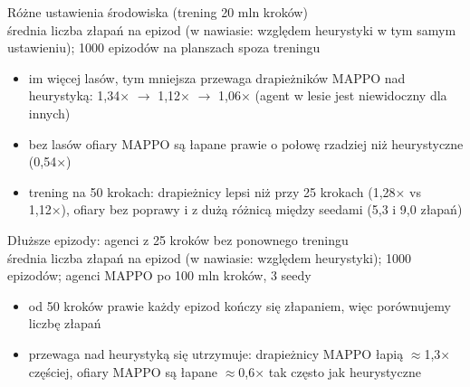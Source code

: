 \documentclass[aspectratio=169,10pt]{beamer}
\begin{document}
\begin{frame}{Różne ustawienia środowiska (trening 20 mln kroków)}
  \centering
  \scriptsize
  \\[2pt]
  {\tiny średnia liczba złapań na epizod (w nawiasie: względem heurystyki w tym samym ustawieniu); 1000 epizodów na planszach spoza treningu}\\[8pt]
  \raggedright
  \small
  \begin{itemize}
    \item im więcej lasów, tym mniejsza przewaga drapieżników MAPPO nad heurystyką: 1,34× $\to$ 1,12× $\to$ 1,06×
      (agent w lesie jest niewidoczny dla innych)
    \item bez lasów ofiary MAPPO są łapane prawie o połowę rzadziej niż heurystyczne (0,54×)
    \item trening na 50 krokach: drapieżnicy lepsi niż przy 25 krokach (1,28× vs 1,12×),
      ofiary bez poprawy i z dużą różnicą między seedami (5,3 i 9,0 złapań)
  \end{itemize}
\end{frame}

\begin{frame}{Dłuższe epizody: agenci z 25 kroków bez ponownego treningu}
  \centering
  \scriptsize
  \\[2pt]
  {\tiny średnia liczba złapań na epizod (w nawiasie: względem heurystyki); 1000 epizodów; agenci MAPPO po 100 mln kroków, 3 seedy}\\[8pt]
  \raggedright
  \small
  \begin{itemize}
    \item od 50 kroków prawie każdy epizod kończy się złapaniem, więc porównujemy liczbę złapań
    \item przewaga nad heurystyką się utrzymuje: drapieżnicy MAPPO łapią $\approx$1,3× częściej,
      ofiary MAPPO są łapane $\approx$0,6× tak często jak heurystyczne
  \end{itemize}
\end{frame}
\end{document}
